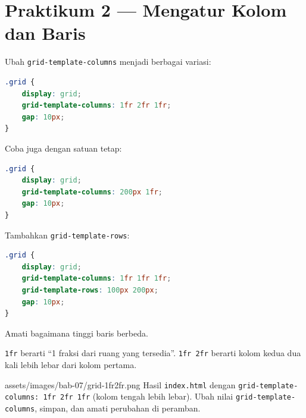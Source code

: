 \section{Praktikum 2 --- Mengatur Kolom dan Baris}
\label{sec:grid-praktik-2}

\begin{langkah}
  \item Ubah \texttt{grid-template-columns} menjadi berbagai variasi:
\end{langkah}

\begin{lstlisting}[language=CSS, caption={Kolom tidak sama lebar}, label={lst:grid-1fr2fr}]
.grid {
    display: grid;
    grid-template-columns: 1fr 2fr 1fr;
    gap: 10px;
}
\end{lstlisting}

\begin{langkah}
  \item Coba juga dengan satuan tetap:
\end{langkah}

\begin{lstlisting}[language=CSS, caption={Kolom tetap + fleksibel}, label={lst:grid-fixed}]
.grid {
    display: grid;
    grid-template-columns: 200px 1fr;
    gap: 10px;
}
\end{lstlisting}

\begin{langkah}
  \item Tambahkan \texttt{grid-template-rows}:
\end{langkah}

\begin{lstlisting}[language=CSS, caption={Mengatur tinggi baris}, label={lst:grid-rows}]
.grid {
    display: grid;
    grid-template-columns: 1fr 1fr 1fr;
    grid-template-rows: 100px 200px;
    gap: 10px;
}
\end{lstlisting}

\begin{langkah}
  \item Amati bagaimana tinggi baris berbeda.
\end{langkah}

\begin{tip}
\texttt{1fr} berarti ``1 fraksi dari ruang yang tersedia''. \texttt{1fr 2fr} berarti kolom kedua dua kali lebih lebar dari kolom pertama.
\end{tip}

\begin{tangkapanlayar}
  {assets/images/bab-07/grid-1fr2fr.png}
  {Hasil \texttt{index.html} dengan \texttt{grid-template-columns: 1fr 2fr 1fr} (kolom tengah lebih lebar).}
  {Ubah nilai \texttt{grid-template-columns}, simpan, dan amati perubahan di peramban.}
\end{tangkapanlayar}

